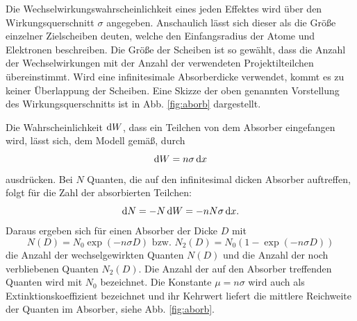 Die Wechselwirkungswahrscheinlichkeit eines jeden Effektes wird über den Wirkungsquerschnitt $\sigma$ angegeben.
 Anschaulich lässt sich dieser als die Größe einzelner Zielscheiben deuten, welche den Einfangsradius der Atome und Elektronen beschreiben. Die Größe der Scheiben ist so gewählt, dass die Anzahl der Wechselwirkungen mit der Anzahl der verwendeten Projektilteilchen  übereinstimmt. Wird eine infinitesimale Absorberdicke verwendet, kommt es zu keiner Überlappung der Scheiben. Eine Skizze der oben genannten Vorstellung des Wirkungsquerschnitts ist in Abb. \ref{fig:aborb} dargestellt.
 
 Die Wahrscheinlichkeit $\mathop{}\!\mathrm{d} W$, dass ein Teilchen von dem Absorber eingefangen wird, lässt sich, dem Modell gemäß, durch
 \begin{equation}
    \mathop{}\!\mathrm{d} W = n \sigma \mathop{}\!\mathrm{d} x
 \end{equation}
 ausdrücken. Bei $N$ Quanten, die auf den infinitesimal dicken Absorber auftreffen, folgt für die Zahl der absorbierten Teilchen:
\begin{equation}
   \mathop{}\!\mathrm{d} N = -N  \mathop{}\!\mathrm{d} W =-n N \sigma \mathop{}\!\mathrm{d} x.
\end{equation}
Daraus ergeben sich für einen Absorber der Dicke $D$ mit
\begin{equation}
N(D) = N_0 \exp(-n \sigma D) \text{  bzw.  }  N_2(D) = N_0 (1 - \exp(-n \sigma D)) \label{eq:Nd}
\end{equation}
die Anzahl der wechselgewirkten Quanten $N(D)$ und die Anzahl der noch verbliebenen Quanten $N_2(D)$. Die Anzahl der auf den Absorber treffenden Quanten wird mit $N_0$ bezeichnet. Die Konstante $ \mu = n \sigma$ wird auch als Extinktionskoeffizient bezeichnet und ihr Kehrwert liefert die mittlere Reichweite der Quanten im Absorber, siehe Abb. \ref{fig:aborb}.

